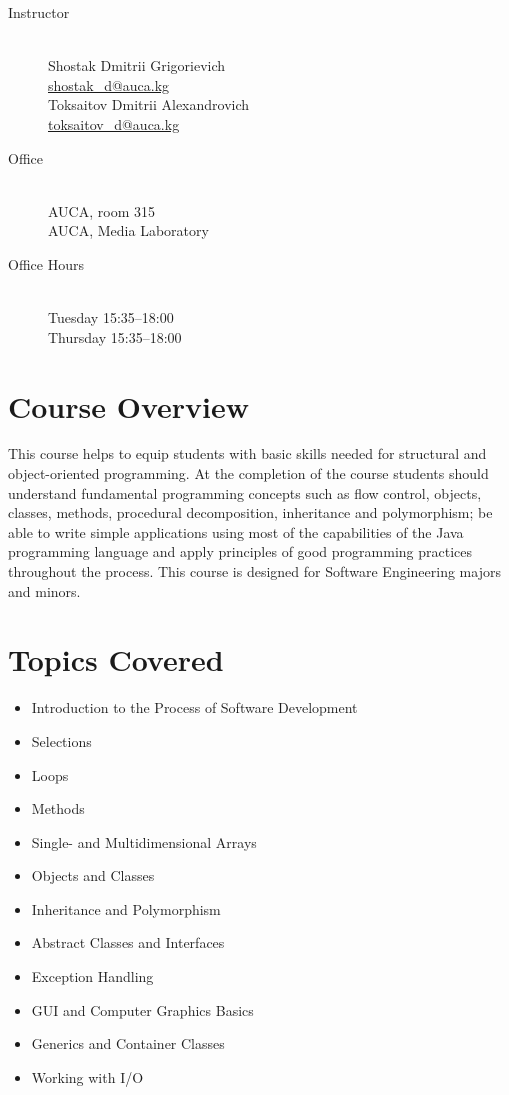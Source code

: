 \documentclass[12pt,a4paper,oneside]{article}
\begin{document}
        \begin{description}
            \item[Instructor]\hfill\\
                Shostak Dmitrii Grigorievich\\
                \href{mailto:shostak_d@auca.kg}{shostak\_d@auca.kg}\\
                Toksaitov Dmitrii Alexandrovich\\
                \href{mailto:toksaitov_d@auca.kg}{toksaitov\_d@auca.kg}
            \item[Office]\hfill\\
                AUCA, room 315\\
                AUCA, Media Laboratory
            \item[Office Hours]\hfill\\
                Tuesday 15:35--18:00\\
                Thursday 15:35--18:00
        \end{description}

    \section{Course Overview}

        This course helps to equip students with basic skills needed for
        structural and object-oriented programming. At the completion of the
        course students should understand fundamental programming concepts such
        as flow control, objects, classes, methods, procedural decomposition,
        inheritance and polymorphism; be able to write simple applications using
        most of the capabilities of the Java programming language and apply
        principles of good programming practices throughout the process.  This
        course is designed for Software Engineering majors and minors.

    \section{Topics Covered}

        \begin{itemize}
            \item Introduction to the Process of Software Development
            \item Selections
            \item Loops
            \item Methods
            \item Single- and Multidimensional Arrays
            \item Objects and Classes
            \item Inheritance and Polymorphism
            \item Abstract Classes and Interfaces
            \item Exception Handling
            \item GUI and Computer Graphics Basics
            \item Generics and Container Classes
            \item Working with I/O
        \end{itemize}
\end{document}
